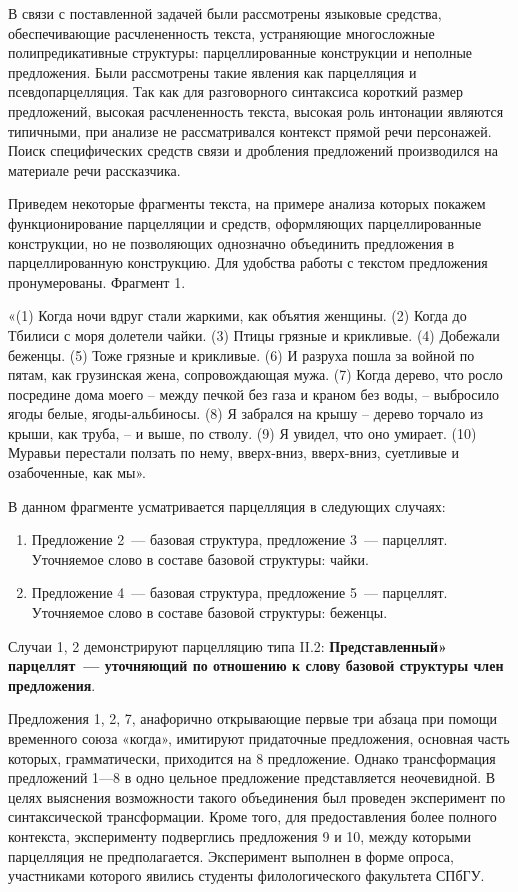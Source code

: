\documentclass{kursa4}
\begin{document}
{      В связи с поставленной задачей были рассмотрены языковые средства, обеспечивающие расчлененность текста, устраняющие многосложные полипредикативные структуры: парцеллированные конструкции и неполные предложения. Были рассмотрены такие явления как парцелляция и псевдопарцелляция. Так как для разговорного синтаксиса короткий размер предложений, высокая расчлененность текста, высокая роль интонации являются типичными, при анализе не рассматривался контекст прямой речи персонажей. Поиск специфических средств связи и дробления предложений производился на материале речи рассказчика. 

      Приведем некоторые фрагменты текста, на примере анализа которых покажем функционирование парцелляции и средств, оформляющих парцеллированные конструкции, но не позволяющих однозначно объединить предложения в парцеллированную конструкцию. Для удобства работы с текстом предложения пронумерованы. Фрагмент 1. 

      «(1) Когда ночи вдруг стали жаркими, как объятия женщины. (2) Когда до Тбилиси с моря долетели чайки. (3) Птицы грязные и крикливые. (4) Добежали беженцы. (5) Тоже грязные и крикливые. (6) И разруха пошла за войной по пятам, как грузинская жена, сопровождающая мужа. (7) Когда дерево, что росло посредине дома моего – между печкой без газа и краном без воды, – выбросило ягоды белые, ягоды-альбиносы. (8) Я забрался на крышу – дерево торчало из крыши, как труба, – и выше, по стволу. (9) Я увидел, что оно умирает. (10) Муравьи перестали ползать по нему, вверх-вниз, вверх-вниз, суетливые и озабоченные, как мы». 

      В данном фрагменте усматривается парцелляция в следующих случаях: \begin{enumerate}
        \item Предложение 2~--- базовая структура, предложение 3~--- парцеллят. \newline
        Уточняемое слово в составе базовой структуры: чайки. 

        \item Предложение 4~--- базовая структура, предложение 5~--- парцеллят. \newline
        Уточняемое слово в составе базовой структуры: беженцы. 
      \end{enumerate}

      Случаи 1, 2 демонстрируют парцелляцию типа II.2: \textbf{Представленный» парцеллят~--- уточняющий по отношению к слову базовой структуры член предложения}. 

      Предложения 1, 2, 7, анафорично открывающие первые три абзаца при помощи временного союза «когда», имитируют придаточные предложения, основная часть которых, грамматически, приходится на 8 предложение. Однако трансформация предложений 1—8 в одно цельное предложение представляется неочевидной. В целях выяснения возможности такого объединения был проведен эксперимент по синтаксической трансформации. Кроме того, для предоставления более полного контекста, эксперименту подверглись предложения 9 и 10, между которыми парцелляция не предполагается. Эксперимент выполнен в форме опроса, участниками которого явились студенты филологического факультета СПбГУ. 

}
\end{document}
